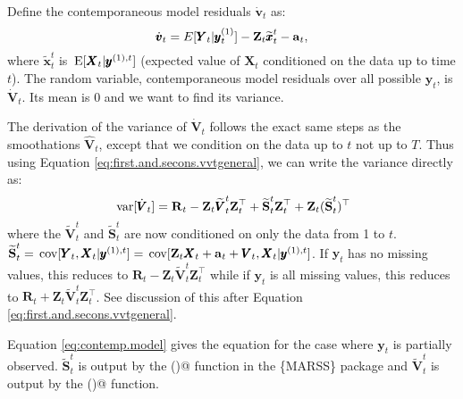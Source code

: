 \documentclass[]{article}
\def\XI{\mbox{\boldmath $\Xi$}}
\def\E{\,\textup{\textrm{E}}}
\def\RR{\mbox{$\mathbf R$}}	 \def\rr{\mbox{$\mathbf r$}} \def\Rb{\mbox{$\mathbf H$}}	\def\Rm{\mathbb{R}}
\def\Ss{\mbox{$\mathbf S$}}
\def\VV{\mbox{$\pmb{V}$}}	\def\vv{\mbox{$\pmb{v}$}}
\def\XX{\mbox{$\pmb{X}$}}	\def\xx{\mbox{$\pmb{x}$}}
\def\YY{\mbox{$\pmb{Y}$}}	\def\yy{\mbox{$\pmb{y}$}}
\def\ZZ{\mbox{$\mathbf Z$}}	\def\zz{\mbox{$\mathbf z$}}	\def\Zb{\mbox{$\mathbf M$}} \def\Za{\mbox{$\mathbf N$}} \def\Zm{\XI}
\def\var{\,\textup{\textrm{var}}}
\def\cov{\,\textup{\textrm{cov}}}
\def\hatxtt{\widetilde{\xx}_t^{t}}
\def\hatVt{\widehat{\VV}_t}
\def\dotvt{\dot{\vv}_t}
\def\dotVt{\dot{\VV}_t}
\def\hatVtt{\widetilde{\VV}_t^{t}}
\def\hatStt{\widetilde{\Ss}_t^{t}}
\begin{document}
Define the contemporaneous model residuals $\dotvt$ as:
\begin{equation}\label{eq:vtt}
\dotvt = E[\YY_t|\yy^{(1)}_t] - \ZZ_t\hatxtt - \aa_t,
\end{equation}
where $\hatxtt$ is $\E[\XX_t|\yy^{(1),t}]$ (expected value of $\XX_t$ conditioned on the data up to time $t$). The random variable, contemporaneous model residuals over all possible $\yy_t$, is $\dotVt$. Its mean is 0 and we want to find its variance. 

The derivation of the variance of $\dotVt$ follows the exact same steps as the smoothations $\hatVt$, except that we condition on the data up to $t$ not up to $T$. Thus using Equation \ref{eq:first.and.secons.vvtgeneral}, we can write the variance directly as:
\begin{equation}\label{eq:contemp.model}
\var[\dotVt] = \RR_t - \ZZ_t \hatVtt \ZZ_t^\top + \hatStt\ZZ_t^\top + \ZZ_t(\hatStt)^\top
\end{equation}
where the $\hatVtt$ and $\hatStt$ are now conditioned on only the data from 1 to $t$.
$\hatStt = \cov[\YY_t,\XX_t|\yy^{(1), t}] = \cov[\ZZ_t \XX_t + \aa_t+\VV_t,\XX_t|\yy^{(1), t}]$. 
If $\yy_t$ has no missing values, this reduces to $\RR_t - \ZZ_t \hatVtt \ZZ_t^\top$ while if $\yy_t$ is all missing values, this reduces to $\RR_t + \ZZ_t \hatVtt \ZZ_t^\top$. See discussion of this after Equation \ref{eq:first.and.secons.vvtgeneral}.

Equation \ref{eq:contemp.model} gives the equation for the case where $\yy_t$ is partially observed. $\hatStt$ is output by the \verb@MARSShatyt()@ function in the \{MARSS\} package and $\hatVtt$ is output by the \verb@MARSSkfss()@ function.



\end{document}

